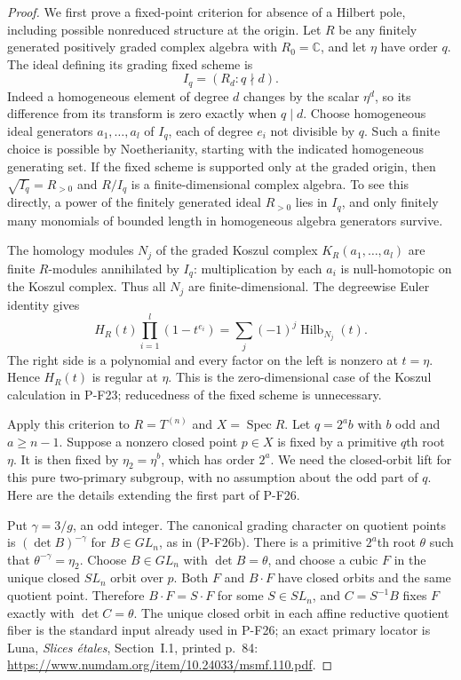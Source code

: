 \begin{proof}
We first prove a fixed-point criterion for absence of a Hilbert
pole, including possible nonreduced structure at the origin.
Let $R$ be any finitely generated positively graded complex
algebra with $R_0=\mathbb C$, and let $\eta$ have order $q$.
The ideal defining its grading fixed scheme is
\[
                    I_q=(R_d:q\nmid d).                     \tag{P-F56h}
\]
Indeed a homogeneous element of degree $d$ changes by
the scalar $\eta^d$, so its difference from its transform
is zero exactly when $q\mid d$.
Choose homogeneous ideal generators $a_1,\ldots,a_l$ of
$I_q$, each of degree $e_i$ not divisible by $q$.
Such a finite choice is possible by Noetherianity, starting
with the indicated homogeneous generating set.
If the fixed scheme is supported only at the graded origin,
then $\sqrt{I_q}=R_{>0}$ and $R/I_q$ is a finite-dimensional
complex algebra. To see this directly, a power of the finitely
generated ideal $R_{>0}$ lies in $I_q$, and only finitely many
monomials of bounded length in homogeneous algebra generators
survive.

The homology modules $N_j$ of the graded Koszul complex
$K_R(a_1,\ldots,a_l)$ are finite $R$-modules annihilated by
$I_q$: multiplication by each $a_i$ is null-homotopic on
the Koszul complex. Thus all $N_j$ are finite-dimensional.
The degreewise Euler identity gives
\[
 H_R(t)\prod_{i=1}^l(1-t^{e_i})
                    =\sum_j(-1)^j\operatorname{Hilb}_{N_j}(t).
 \tag{P-F56i}
\]
The right side is a polynomial and every factor on the left
is nonzero at $t=\eta$. Hence $H_R(t)$ is regular at $\eta$.
This is the zero-dimensional case of the Koszul calculation
in P-F23; reducedness of the fixed scheme is unnecessary.

Apply this criterion to $R=T^{(n)}$ and $X=\operatorname{Spec}R$.
Let $q=2^ab$ with $b$ odd and $a\ge n-1$.
Suppose a nonzero closed point $p\in X$ is fixed by a primitive
$q$th root $\eta$. It is then fixed by
$\eta_2=\eta^b$, which has order $2^a$.
We need the closed-orbit lift for this pure two-primary
subgroup, with no assumption about the odd part of $q$.
Here are the details extending the first part of P-F26.

Put $\gamma=3/g$, an odd integer. The canonical grading
character on quotient points is
$(\det B)^{-\gamma}$ for $B\in GL_n$, as in (P-F26b).
There is a primitive $2^a$th root $\theta$ such that
$\theta^{-\gamma}=\eta_2$.
Choose $B\in GL_n$ with $\det B=\theta$, and choose
a cubic $F$ in the unique closed $SL_n$ orbit over $p$.
Both $F$ and $B\cdot F$ have closed orbits and the same
quotient point. Therefore $B\cdot F=S\cdot F$ for some
$S\in SL_n$, and $C=S^{-1}B$ fixes $F$ exactly with
$\det C=\theta$.
The unique closed orbit in each affine reductive quotient
fiber is the standard input already used in P-F26; an exact
primary locator is Luna, \emph{Slices \'etales},
Section~I.1, printed p.~84:
\url{https://www.numdam.org/item/10.24033/msmf.110.pdf}.


\end{proof}
